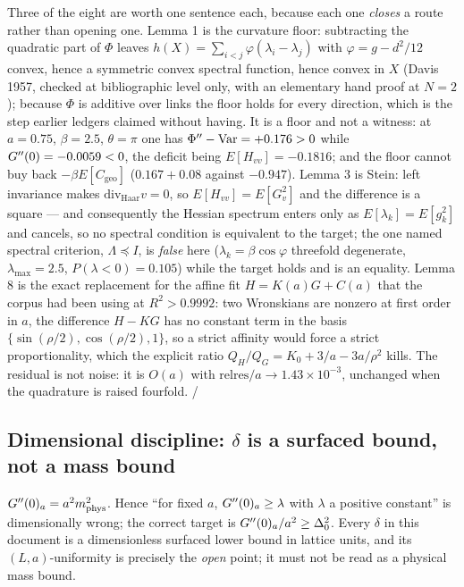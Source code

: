 \noindent
Three of the eight are worth one sentence each, because each one \emph{closes} a route rather than
opening one. Lemma 1 is the curvature floor: subtracting the quadratic part of $\Phi$ leaves
$h(X)=\sum_{i<j}\varphi(\lambda_{i}-\lambda_{j})$ with $\varphi=g-d^{2}/12$ convex, hence a symmetric
convex spectral function, hence convex in $X$ (Davis 1957, checked at bibliographic level only, with an
elementary hand proof at $N=2$); because $\Phi$ is additive over links the floor holds for every
direction, which is the step earlier ledgers claimed without having. It is a floor and not a witness:
at $a=0.75$, $\beta=2.5$, $\theta=\pi$ one has $\Phi''-\operatorname{Var}=+0.176>0$ while $G''(0)=-0.0059<0$, the
deficit being $E[H_{vv}]=-0.1816$; and the floor cannot buy back $-\beta E[C_{\mathrm{geo}}]$
($0.167+0.08$ against $-0.947$). Lemma 3 is Stein: left invariance makes $\mathrm{div}_{\mathrm{Haar}}v=0$,
so $E[H_{vv}]=E[G_{v}^{2}]$ and the difference is a square --- and consequently the Hessian spectrum
enters only as $E[\lambda_{k}]=E[g_{k}^{2}]$ and cancels, so no spectral condition is equivalent to the
target; the one named spectral criterion, $\Lambda\preceq I$, is \emph{false} here
($\lambda_{k}=\beta\cos\varphi$ threefold degenerate, $\lambda_{\max}=2.5$, $P(\lambda<0)=0.105$) while
the target holds and is an equality. Lemma 8 is the exact replacement for the affine fit
$H=K(a)G+C(a)$ that the corpus had been using at $R^{2}>0.9992$: two Wronskians are nonzero at first
order in $a$, the difference $H-KG$ has no constant term in the basis
$\{\sin(\rho/2),\cos(\rho/2),1\}$, so a strict affinity would force a strict proportionality, which the
explicit ratio $Q_{H}/Q_{G}=K_{0}+3/a-3a/\rho^{2}$ kills. The residual is not noise: it is
$O(a)$ with $\mathrm{relres}/a\to1.43\times10^{-3}$, unchanged when the quadrature is raised fourfold.
\LT{}/~\LE
{}

\subsection{Dimensional discipline: $\delta$ is a surfaced bound, not a mass bound}

$G''(0)_a = a^{2}m_{\mathrm{phys}}^{2}$. Hence ``for fixed $a$, $G''(0)_a \ge \lambda$ with $\lambda$ a
positive constant'' is dimensionally wrong; the correct target is
$G''(0)_a/a^{2}\ge\Delta_0^{2}$. Every $\delta$ in this document is a dimensionless surfaced lower
bound in lattice units, and its $(L,a)$-uniformity is precisely the \emph{open} point; it must not be
read as a physical mass bound. \LT
{}

